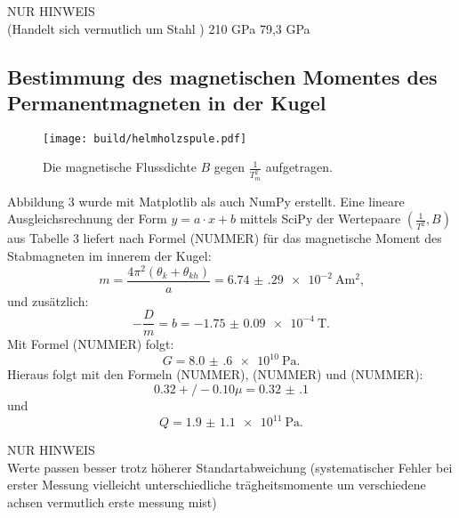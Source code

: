 NUR HINWEIS\\
(Handelt sich vermutlich um Stahl \cite[624\psq]{TaschenbuchPhysik}) 210 GPa
\cite{EinführungMechanik}  	79,3 GPa






\subsection{Bestimmung des magnetischen Momentes des Permanentmagneten in der Kugel}
\begin{figure}[H]
	\centering
	\caption{Die magnetische Flussdichte $B$ gegen $\frac{1}{T_m ^2}$ aufgetragen.}
	\texttt{[image: build/helmholzspule.pdf]}
	\label{fig:grad3}
\end{figure}

Abbildung 3 wurde mit Matplotlib \cite{matplotlib} als auch NumPy \cite{numpy} erstellt.
Eine lineare Ausgleichsrechnung der Form $y = a \cdot x + b$ mittels SciPy \cite{scipy} der Wertepaare $\left(\frac{1}{T^2}, B\right)$ aus Tabelle 3 liefert nach Formel (NUMMER) für das magnetische Moment des Stabmagneten im innerem der Kugel:
\begin{equation}
	m = \frac{4 \pi ^2 (\theta_k + \theta_{kh})}{a} = \SI{6.74(29)e-2}{\ampere\meter\squared}\text{,}
\end{equation}
und zusätzlich:
\begin{equation} 
	-\frac{D}{m} = b =  \SI{-1.75(9)e-4}{\tesla}\text{.}
\end{equation}
Mit Formel (NUMMER) folgt:
\begin{equation} 
	G =  \SI{8.0(6)e10}{\pascal}\text{.}
\end{equation}
Hieraus folgt mit den Formeln (NUMMER), (NUMMER) und (NUMMER):
\begin{equation} 0.32+/-0.10
	\mu = \num{0.32(10)}
\end{equation}
und
\begin{equation} 
	Q =  \SI{1.9(11)e11}{\pascal}\text{.}
\end{equation}

NUR HINWEIS\\
Werte passen besser trotz höherer Standartabweichung (systematischer Fehler bei erster Messung vielleicht unterschiedliche trägheitsmomente um verschiedene achsen vermutlich erste messung mist)






